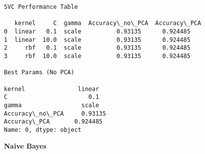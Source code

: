 \documentclass[11pt]{article}
\begin{document}
    \begin{Verbatim}[commandchars=\\\{\}]
SVC Performance Table

   kernel     C  gamma  Accuracy\_no\_PCA  Accuracy\_PCA
0  linear   0.1  scale          0.93135      0.924485
1  linear  10.0  scale          0.93135      0.924485
2     rbf   0.1  scale          0.93135      0.924485
3     rbf  10.0  scale          0.93135      0.924485

Best Params (No PCA)

kernel               linear
C                       0.1
gamma                 scale
Accuracy\_no\_PCA     0.93135
Accuracy\_PCA       0.924485
Name: 0, dtype: object

    \end{Verbatim}
\vspace{0.8cm}
    \begin{center}
    \end{center}
  \vspace{0.8cm}  
    \textbf{Naive Bayes}
\end{document}
